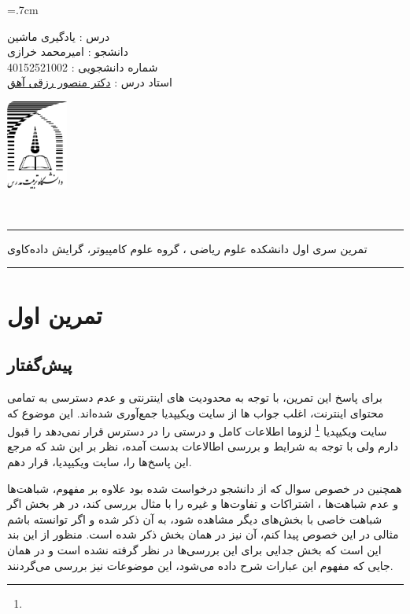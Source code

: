\documentclass[a4paper, 12pt]{article}
\begin{document}
	
\noindent
\begin{minipage}[c]{5cm}
	\baselineskip=.7cm
	\begin{flushright}
		درس : یادگیری ماشین 
		\\
		دانشجو :
		امیرمحمد خرازی
		\\
		شماره دانشجویی :
		40152521002 
		\\
		استاد درس :  
		\href{mrezghi.ir}{دکتر منصور رزقی آهق}
	\end{flushright}
\end{minipage}
\hfill
\begin{minipage}[c]{3cm}
	\begin{center}
		\href{modares.ac.ir}{
			\includegraphics[width=2cm]{logo.png}}
	\end{center}	
\end{minipage}
\\[1mm]
\hrule depth .5mm \relax
\begin{flushright}
	تمرین سری اول
	\hfill
	دانشکده علوم ریاضی ، گروه علوم کامپیوتر، گرایش داده‌کاوی
\end{flushright}

\hrule depth .5mm\relax

\section*{تمرین اول }
\subsection*{پیش‌گفتار}
	برای پاسخ این تمرین، با توجه به محدودیت های اینترنتی و عدم دسترسی به تمامی محتوای اینترنت، اغلب جواب ها از سایت ویکیپدیا جمع‌آوری شده‌اند. این موضوع که سایت ویکیپدیا
	\footnote{}
	 لزوما اطلاعات کامل و درستی را در دسترس قرار نمی‌دهد را قبول دارم ولی با توجه به شرایط و بررسی اطالاعات بدست آمده، نظر بر این شد که مرجع این پاسخ‌ها را، سایت ویکیپدیا، قرار دهم. 

همچنین در خصوص سوال که از دانشجو درخواست شده بود علاوه بر مفهوم، شباهت‌ها و عدم شباهت‌ها ، اشتراکات و تفاوت‌ها و غیره را با مثال بررسی کند، در هر بخش اگر شباهت خاصی با بخش‌های دیگر مشاهده شود، به آن ذکر شده و اگر توانسته باشم مثالی در این خصوص پیدا کنم، آن نیز در همان بخش ذکر شده است. منظور از این بند این است که بخش جدایی برای این بررسی‌ها در نظر گرفته نشده است و در همان جایی که مفهوم این عبارات شرح داده می‌شود، این موضوعات نیز بررسی می‌گردنند. 
\end{document}
